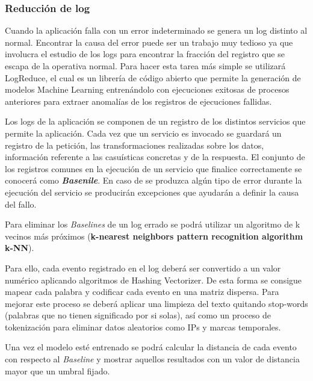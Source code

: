 \subsubsection{Reducción de log}

Cuando la aplicación falla con un error indeterminado se genera un log distinto al normal. Encontrar la causa del error puede ser un trabajo muy tedioso ya que involucra el estudio de los logs para encontrar la fracción del registro que se escapa de la operativa normal. Para hacer esta tarea más simple se utilizará LogReduce, el cual es un librería de código abierto que permite la generación de modelos Machine Learning entrenándolo con ejecuciones exitosas de procesos anteriores para extraer anomalías de los registros de ejecuciones fallidas.

Los logs de la aplicación se componen de un registro de los distintos servicios que permite la aplicación. Cada vez que un servicio es invocado se guardará un registro de la petición, las transformaciones realizadas sobre los datos, información referente a las casuísticas concretas y de la respuesta. El conjunto de los registros comunes en la ejecución de un servicio que finalice correctamente se conocerá como \textbf{\textit{Basenile}}.  En caso de se produzca algún tipo de error durante la ejecución del servicio se producirán excepciones que ayudarán a definir la causa del fallo.


Para eliminar los \textit{Baselines} de un log errado se podrá utilizar un algoritmo de k vecinos más próximos (\textbf{k-nearest neighbors pattern recognition algorithm k-NN}). 

Para ello, cada evento registrado en el log deberá ser convertido a un valor numérico aplicando algoritmos de Hashing Vectorizer. De esta forma se consigue mapear cada palabra y codificar cada evento en una matriz dispersa. Para mejorar este proceso se deberá aplicar una limpieza del texto quitando stop-words (palabras que no tienen significado por si solas), así como un proceso de tokenización para eliminar datos aleatorios como IPs y marcas temporales.

Una vez el modelo esté entrenado se podrá calcular la distancia de cada evento con respecto al \textit{Baseline} y mostrar aquellos resultados con un valor de distancia mayor que un umbral fijado. 

